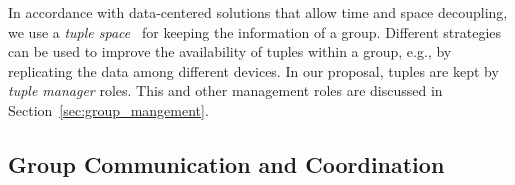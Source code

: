 In accordance with data-centered solutions that allow time and space decoupling, we use a \textit{tuple space}~\cite{LINDA, LIME, TOTA} for keeping the information of a group. Different strategies can be used to improve the availability of tuples within a group, e.g., by replicating the data among different devices. In our proposal, tuples are kept by \textit{tuple manager} roles. This and other management roles are discussed in Section~\ref{sec:group_mangement}.


%

\subsection{Group Communication and Coordination}\label{sec:group_cc}

 




